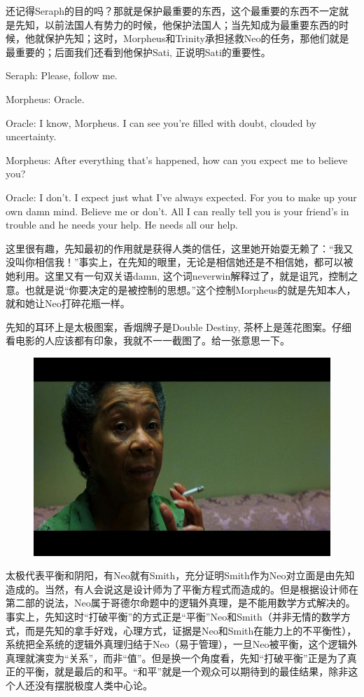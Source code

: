 \documentclass[UTF8]{ctexart}
\newenvironment{myquote}{\color{green} \setlength{\leftskip}{6em} \setlength{\rightskip}{4em} \setlength{\parindent}{-2em}}{\par}
\begin{document}
还记得Seraph的目的吗？那就是保护最重要的东西，这个最重要的东西不一定就是先知，以前法国人有势力的时候，他保护法国人；当先知成为最重要东西的时候，他就保护先知；这时，Morpheus和Trinity承担拯救Neo的任务，那他们就是最重要的；后面我们还看到他保护Sati, 正说明Sati的重要性。

\begin{myquote}
Seraph: Please, follow me.

Morpheus: Oracle.

Oracle: I know, Morpheus. I can see you're filled with doubt, clouded by uncertainty.

Morpheus: After everything that's happened, how can you expect me to believe you?

Oracle: I don't. I expect just what I've always expected. For you to make up your own damn mind. Believe me or don't. All I can really tell you is your friend's in trouble and he needs your help. He needs all our help.
\end{myquote}

这里很有趣，先知最初的作用就是获得人类的信任，这里她开始耍无赖了：“我又没叫你相信我！”事实上，在先知的眼里，无论是相信她还是不相信她，都可以被她利用。这里又有一句双关语damn, 这个词neverwin解释过了，就是诅咒，控制之意。也就是说“你要决定的是被控制的思想。”这个控制Morpheus的就是先知本人，就和她让Neo打碎花瓶一样。

先知的耳环上是太极图案，香烟牌子是Double Destiny, 茶杯上是莲花图案。仔细看电影的人应该都有印象，我就不一一截图了。给一张意思一下。

\begin{figure}[htb]
\centering
\includegraphics[width=0.5\linewidth]{fig/14a938db9f7b7466d0164e8c.jpg}
\end{figure}

太极代表平衡和阴阳，有Neo就有Smith，充分证明Smith作为Neo对立面是由先知造成的。当然，有人会说这是设计师为了平衡方程式而造成的。但是根据设计师在第二部的说法，Neo属于哥德尔命题中的逻辑外真理，是不能用数学方式解决的。事实上，先知这时“打破平衡”的方式正是“平衡”Neo和Smith（并非无情的数学方式，而是先知的拿手好戏，心理方式，证据是Neo和Smith在能力上的不平衡性），系统把全系统的逻辑外真理归结于Neo（易于管理），一旦Neo被平衡，这个逻辑外真理就演变为“关系”，而非“值”。但是换一个角度看，先知“打破平衡”正是为了真正的平衡，就是最后的和平。“和平”就是一个观众可以期待到的最佳结果，除非这个人还没有摆脱极度人类中心论。
\end{document}
